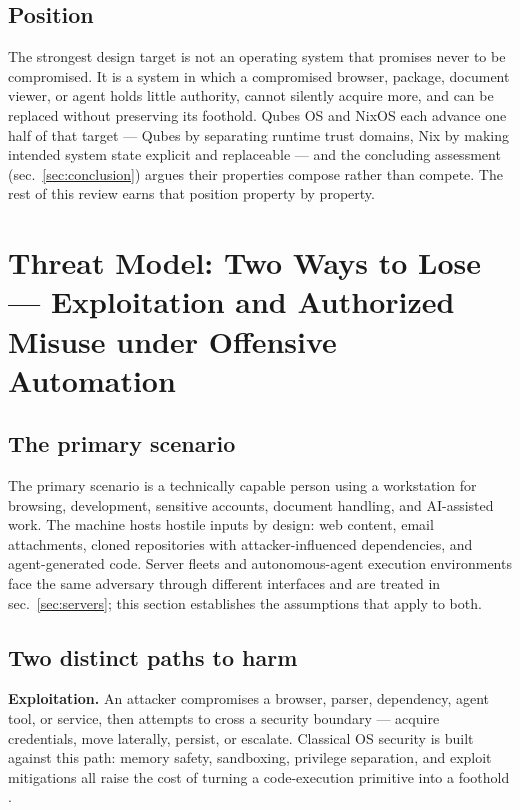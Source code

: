 \documentclass[
  english,
  9pt,
]{extarticle}
\begin{document}
\subsection{Position}\label{position}

The strongest design target is not an operating system that promises
never to be compromised. It is a system in which a compromised browser,
package, document viewer, or agent holds little authority, cannot
silently acquire more, and can be replaced without preserving its
foothold. Qubes OS and NixOS each advance one half of that target ---
Qubes by separating runtime trust domains, Nix by making intended system
state explicit and replaceable --- and the concluding assessment
(sec.~\ref{sec:conclusion}) argues their properties compose rather than
compete. The rest of this review earns that position property by
property.

\newpage

\section{Threat Model: Two Ways to Lose --- Exploitation and Authorized
Misuse under Offensive Automation}\label{sec:threat_model}

\subsection{The primary scenario}\label{the-primary-scenario}

The primary scenario is a technically capable person using a workstation
for browsing, development, sensitive accounts, document handling, and
AI-assisted work. The machine hosts hostile inputs by design: web
content, email attachments, cloned repositories with attacker-influenced
dependencies, and agent-generated code. Server fleets and
autonomous-agent execution environments face the same adversary through
different interfaces and are treated in sec.~\ref{sec:servers}; this
section establishes the assumptions that apply to both.

\subsection{Two distinct paths to
harm}\label{two-distinct-paths-to-harm}

\textbf{Exploitation.} An attacker compromises a browser, parser,
dependency, agent tool, or service, then attempts to cross a security
boundary --- acquire credentials, move laterally, persist, or escalate.
Classical OS security is built against this path: memory safety,
sandboxing, privilege separation, and exploit mitigations all raise the
cost of turning a code-execution primitive into a foothold
\citep{saltzer1975, klein2009}.
\end{document}
